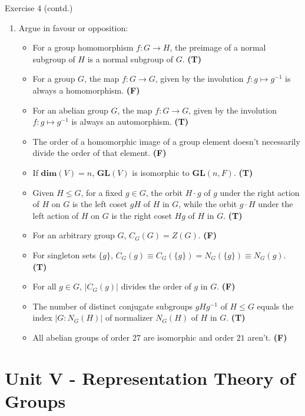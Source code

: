 \documentclass{beamer}
\newcounter{savedenum}
\newcommand*{\resume}{\setcounter{enumi}{\thesavedenum}}
\begin{document}
\begin{frame}{Exercise 4 (contd.)}
    \begin{enumerate}
        \resume
        \item Argue in favour or opposition:
        \begin{itemize}
            \item For a group homomorphism $f:G\xrightarrow{}H$, the preimage of a normal subgroup of $H$ is a normal subgroup of $G$. \textbf{(T)}
            \item For a group $G$, the map $f:G\xrightarrow{}G$, given by the involution $f:g\mapsto{}g^{-1}$ is always a homomorphism. \textbf{(F)}
            \item For an abelian group $G$, the map $f:G\xrightarrow{}G$, given by the involution $f:g\mapsto{}g^{-1}$ is always an automorphism. \textbf{(T)}
            \item The order of a homomorphic image of a group element doesn't necessarily divide the order of that element. \textbf{(F)}
            \item If $\mathbf{dim}(V)=n$, $\mathbf{GL}(V)$ is isomorphic to $\mathbf{GL}(n,F)$. \textbf{(T)}
            \item Given $H\leq G$, for a fixed $g\in G$, the orbit $H\cdot g$ of $g$ under the right action of $H$ on $G$ is the left coset $gH$ of $H$ in $G$, while the orbit $g\cdot H$ under the left action of $H$ on $G$ is the right coset $Hg$ of $H$ in $G$. \textbf{(T)}
            \item For an arbitrary group $G$, $C_G(G)=Z(G)$. \textbf{(F)}
            \item For singleton sets $\{g\}$, $C_G(g)\equiv C_G(\{g\})=N_G(\{g\})\equiv N_G(g)$. \textbf{(T)}
            \item For all $g\in G$, $\lvert C_G(g)\rvert$ divides the order of $g$ in $G$. \textbf{(F)}
            \item The number of distinct conjugate subgroups $gHg^{-1}$ of $H\leq G$ equals the index $\lvert G:N_G(H)\rvert$ of normalizer $N_G(H)$ of $H$ in $G$. \textbf{(T)}
            \item All abelian groups of order $27$ are isomorphic and order $21$ aren't. \textbf{(F)}
        \end{itemize}
    \end{enumerate}
\end{frame}

\section{Unit V - Representation Theory of Groups}
\end{document}
